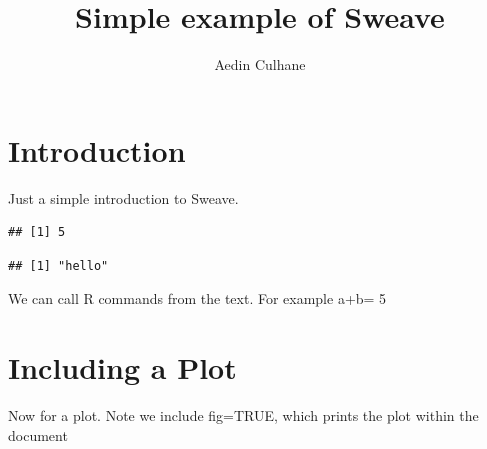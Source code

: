 \title{Simple example of Sweave}
\author{Aedin Culhane}



\maketitle
\tableofcontents


\section{Introduction}

Just a simple introduction to Sweave. 

\begin{knitrout}
\color{fgcolor}\begin{kframe}
\begin{alltt}
\hlkwb{=}
\hlkwb{=}
\hlopt{+}
\end{alltt}
\begin{verbatim}
## [1] 5
\end{verbatim}
\begin{alltt}
\hlstd{(}\hlstd{)}
\end{alltt}
\begin{verbatim}
## [1] "hello"
\end{verbatim}
\end{kframe}
\end{knitrout}

We can call R commands from the text. For example a+b= 5

\section{Including a Plot}
Now for a plot.  Note we include fig=TRUE, which prints the plot within the document


